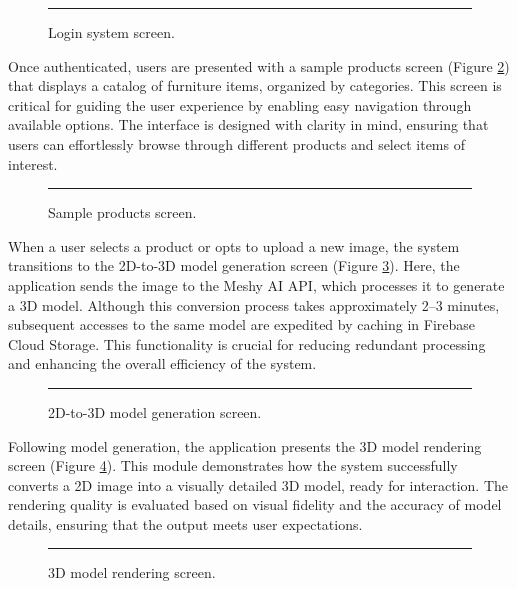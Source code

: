 \documentclass[12pt, a4paper]{article}
\begin{document}
\begin{figure}[h!]
    \centering
    \rule{0.8\columnwidth}{0.3\textheight} %
    \caption{Login system screen.}
    \label{fig:login_system}
\end{figure}

Once authenticated, users are presented with a sample products screen (Figure \ref{fig:sample_products}) that displays a catalog of furniture items, organized by categories. This screen is critical for guiding the user experience by enabling easy navigation through available options. The interface is designed with clarity in mind, ensuring that users can effortlessly browse through different products and select items of interest.

\begin{figure}[h!]
    \centering
    \rule{0.8\columnwidth}{0.3\textheight} %
    \caption{Sample products screen.}
    \label{fig:sample_products}
\end{figure}

When a user selects a product or opts to upload a new image, the system transitions to the 2D-to-3D model generation screen (Figure \ref{fig:2d_to_3d_generation}). Here, the application sends the image to the Meshy AI API, which processes it to generate a 3D model. Although this conversion process takes approximately 2--3 minutes, subsequent accesses to the same model are expedited by caching in Firebase Cloud Storage. This functionality is crucial for reducing redundant processing and enhancing the overall efficiency of the system.

\begin{figure}[h!]
    \centering
    \rule{0.8\columnwidth}{0.3\textheight} %
    \caption{2D-to-3D model generation screen.}
    \label{fig:2d_to_3d_generation}
\end{figure}

Following model generation, the application presents the 3D model rendering screen (Figure \ref{fig:3d_model_rendering}). This module demonstrates how the system successfully converts a 2D image into a visually detailed 3D model, ready for interaction. The rendering quality is evaluated based on visual fidelity and the accuracy of model details, ensuring that the output meets user expectations.

\begin{figure}[h!]
    \centering
    \rule{0.8\columnwidth}{0.3\textheight} %
    \caption{3D model rendering screen.}
    \label{fig:3d_model_rendering}
\end{figure}
\end{document}
